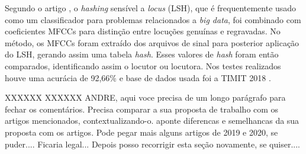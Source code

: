 		\par Segundo o artigo \cite{8396208}, o \textit{hashing} sensível a \textit{locus} (LSH), que é frequentemente usado como um classificador para problemas relacionados a \textit{big data}, foi combinado com coeficientes MFCCs para distinção entre locuções genuínas e regravadas. No método, os MFCCs foram extraído dos arquivos de sinal para posterior aplicação do LSH, gerando assim uma tabela \textit{hash}. Esses valores de \textit{hash} foram então comparados, identificando assim o locutor ou locutora. Nos testes realizados houve uma acurácia de 92,66\% e base de dados usada foi a TIMIT 2018 \cite{TIMIT2018}.
		
		XXXXXX XXXXXX ANDRE, aqui voce precisa de um longo parágrafo para fechar os comentários. Precisa comparar a sua proposta de trabalho com os artigos mencionados, contextualizando-o. aponte diferencas e semelhancas da sua proposta com os artigos. Pode pegar mais alguns artigos de 2019 e 2020, se puder.... Ficaria legal... Depois posso recorrigir esta seção novamente, se quiser.... 